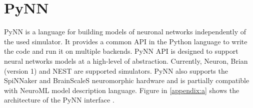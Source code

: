 \section{PyNN}
PyNN is a language for building models of neuronal networks independently of the used simulator. It provides a common API in the Python language to write the code and run it on multiple backends. PyNN API is designed to support neural networks models at a high-level of abstraction. Currently, Neuron, Brian (version 1) and NEST are supported simulators. PyNN also supports the SpiNNaker and BrainScaleS neuromorphic hardware and is partially compatible with NeuroML model description language. Figure in \cref{appendix:a} shows the architecture of the PyNN interface \cite{bruderleNeuroscientificModelingMixedSignal2009}.